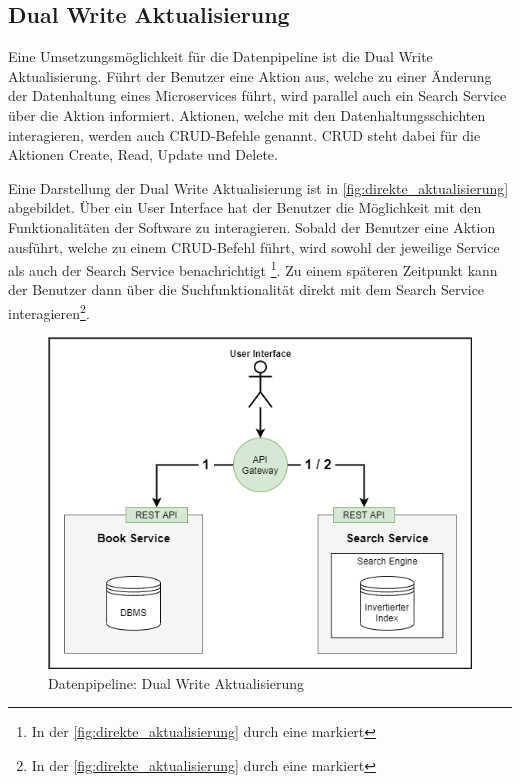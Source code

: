 \subsection{Dual Write Aktualisierung\label{subsec4.2.2:Unterunterpunkt-2}}

Eine Umsetzungsmöglichkeit für die Datenpipeline ist die \glqq Dual Write Aktualisierung\grqq{}. Führt der Benutzer eine Aktion aus, welche zu einer Änderung der Datenhaltung eines Microservices führt, wird parallel auch ein Search Service über die Aktion informiert. Aktionen, welche mit den Datenhaltungsschichten interagieren, werden auch CRUD-Befehle genannt. CRUD steht dabei für die Aktionen \glqq Create\grqq{}, \glqq Read\grqq{}, \glqq Update\grqq{} und \glqq Delete\grqq{}.

Eine Darstellung der \glqq Dual Write Aktualisierung\grqq{} ist in \autoref{fig:direkte_aktualisierung} abgebildet. Über ein User Interface hat der Benutzer die Möglichkeit mit den Funktionalitäten der Software zu interagieren. Sobald der Benutzer eine Aktion ausführt, welche zu einem CRUD-Befehl führt, wird sowohl der jeweilige Service als auch der Search Service benachrichtigt \footnote{In der \autoref{fig:direkte_aktualisierung} durch eine \grqq{} markiert}. Zu einem späteren Zeitpunkt kann der Benutzer dann über die Suchfunktionalität direkt mit dem Search Service interagieren\footnote{In der \autoref{fig:direkte_aktualisierung} durch eine \grqq{} markiert}.

\begin{figure}[H]
    \centering
    \includegraphics[width=0.6\linewidth]{images/direkte_aktualisierung.png}
    \caption{Datenpipeline: Dual Write Aktualisierung}
    \label{fig:direkte_aktualisierung}
\end{figure}

